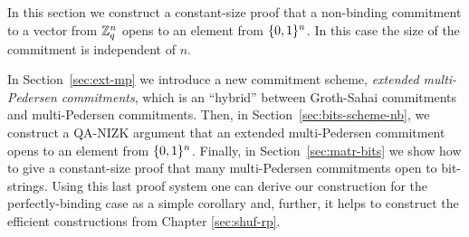 In this section we construct a constant-size proof that a non-binding commitment to a vector from $\mathbb{Z}_q^n$ opens to an element from $\{0,1\}^n$. In this case the size of the commitment is independent of $n$. 

In Section~\ref{sec:ext-mp} we introduce a new commitment scheme, \emph{extended multi-Pedersen commitments}, which is an ``hybrid'' between Groth-Sahai commitments and multi-Pedersen commitments.
Then, in Section~\ref{sec:bits-scheme-nb}, we construct a QA-NIZK argument that an extended multi-Pedersen commitment opens to an element from $\{0,1\}^n$. Finally, in Section~\ref{sec:matr-bits} we show how to give a constant-size proof that many multi-Pedersen commitments open to bit-strings. Using this last proof system one can derive our construction for the perfectly-binding case as a simple corollary and, further, it helps to construct the efficient constructions from Chapter \ref{sec:shuf-rp}.
